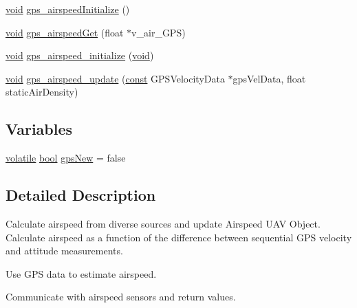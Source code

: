 \begin{DoxyCompactItemize}
\item 
\hyperlink{group___n_a_m_e_ga18028b8badbf1ea7e704ccac3c488e82}{void} \hyperlink{group___airspeed_module_ga189c9d3a29580346591f8dd1e03dd919}{gps\-\_\-airspeed\-Initialize} ()
\item 
\hyperlink{group___n_a_m_e_ga18028b8badbf1ea7e704ccac3c488e82}{void} \hyperlink{group___airspeed_module_gac8b8ff60998625430e286f7797c5ce67}{gps\-\_\-airspeed\-Get} (float $\ast$v\-\_\-air\-\_\-\-G\-P\-S)
\item 
\hyperlink{group___n_a_m_e_ga18028b8badbf1ea7e704ccac3c488e82}{void} \hyperlink{group___airspeed_module_gaaedab067f447c531ce7d8339c7f06e54}{gps\-\_\-airspeed\-\_\-initialize} (\hyperlink{group___n_a_m_e_ga18028b8badbf1ea7e704ccac3c488e82}{void})
\item 
\hyperlink{group___n_a_m_e_ga18028b8badbf1ea7e704ccac3c488e82}{void} \hyperlink{group___airspeed_module_gaf9e1d79b501c8669dc10e519ec0930a2}{gps\-\_\-airspeed\-\_\-update} (\hyperlink{group___n_a_m_e_ga7ae6d0e43244213b34de2c2b9aa30da6}{const} G\-P\-S\-Velocity\-Data $\ast$gps\-Vel\-Data, float static\-Air\-Density)
\end{DoxyCompactItemize}
\subsection*{Variables}
\begin{DoxyCompactItemize}
\item 
\hyperlink{group___c_m_s_i_s___core___instruction_interface_gad7d93af13046b0378601b85c8c16673b}{volatile} \hyperlink{group___exported__types_gaf6a258d8f3ee5206d682d799316314b1}{bool} \hyperlink{group___airspeed_module_ga92e7d8d768e91460a03e1f0ef2c9a443}{gps\-New} = false
\end{DoxyCompactItemize}


\subsection{Detailed Description}
Calculate airspeed from diverse sources and update Airspeed U\-A\-V Object. Calculate airspeed as a function of the difference between sequential G\-P\-S velocity and attitude measurements.

Use G\-P\-S data to estimate airspeed.

Communicate with airspeed sensors and return values.

